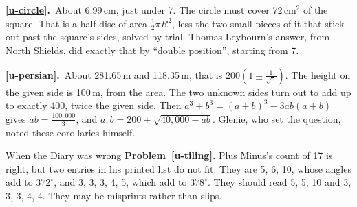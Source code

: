 \documentclass[11pt,a4paper]{article}
\newcommand{\ans}[2]{\par\smallskip\noindent\textbf{\ref{#1}.}\ #2}
\begin{document}
\ans{u-circle}{About 6.99\,cm, just under 7. The circle must cover 72\,cm$^2$ of the
square. That is a half-disc of area $\tfrac12\pi R^2$, less the two small pieces of it
that stick out past the square's sides, solved by trial. Thomas Leybourn's answer, from
North Shields, did exactly that by ``double position'', starting from 7.}
\ans{u-persian}{About 281.65\,m and 118.35\,m, that is $200\left(1\pm\tfrac1{\sqrt6}\right)$.
The height on the given side is 100\,m, from the area. The two unknown sides turn out to
add up to exactly 400, twice the given side. Then
$a^3 + b^3 = (a + b)^3 - 3ab(a + b)$ gives $ab = \tfrac{100{,}000}{3}$, and
$a, b = 200 \pm \sqrt{40{,}000 - ab}$. Glenie, who set the question, noted these
corollaries himself.}

\begin{diarynote}{When the Diary was wrong}
\textbf{Problem~\ref{u-tiling}.} Plus Minus's count of 17 is right, but two entries in
his printed list do not fit. They are 5, 6, 10, whose angles add to $372^\circ$, and
3, 3, 3, 4, 5, which add to $378^\circ$. They should read 5, 5, 10 and 3, 3, 3, 4, 4.
They may be misprints rather than slips.
\end{diarynote}
\end{document}
